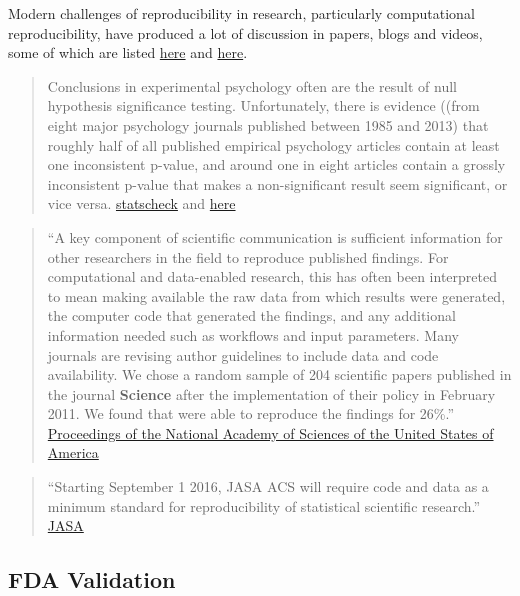 \documentclass[]{book}
\theoremstyle{definition}
\theoremstyle{definition}
\theoremstyle{definition}
\theoremstyle{remark}
\begin{document}
Modern challenges of reproducibility in research, particularly
computational reproducibility, have produced a lot of discussion in
papers, blogs and videos, some of which are listed
\href{http://ropensci.github.io/reproducibility-guide/sections/references/}{here}
and \href{https://reproducibleresearch.net/}{here}.

\begin{quote}
Conclusions in experimental psychology often are the result of null
hypothesis significance testing. Unfortunately, there is evidence ((from
eight major psychology journals published between 1985 and 2013) that
roughly half of all published empirical psychology articles contain at
least one inconsistent p-value, and around one in eight articles contain
a grossly inconsistent p-value that makes a non-significant result seem
significant, or vice versa.
\href{https://mbnuijten.com/statcheck/}{statscheck} and
\href{http://blog.revolutionanalytics.com/2016/10/statcheck.html}{here}
\end{quote}

\begin{quote}
``A key component of scientific communication is sufficient information
for other researchers in the field to reproduce published findings. For
computational and data-enabled research, this has often been interpreted
to mean making available the raw data from which results were generated,
the computer code that generated the findings, and any additional
information needed such as workflows and input parameters. Many journals
are revising author guidelines to include data and code availability. We
chose a random sample of 204 scientific papers published in the journal
\textbf{Science} after the implementation of their policy in February
2011. We found that were able to reproduce the findings for 26\%.''
\href{http://www.pnas.org/content/115/11/2584}{Proceedings of the
National Academy of Sciences of the United States of America}
\end{quote}

\begin{quote}
``Starting September 1 2016, JASA ACS will require code and data as a
minimum standard for reproducibility of statistical scientific
research.''
\href{https://magazine.amstat.org/blog/2016/07/01/jasa-reproducible16/}{JASA}
\end{quote}

\subsection{FDA Validation}\label{fda-validation}
\end{document}
